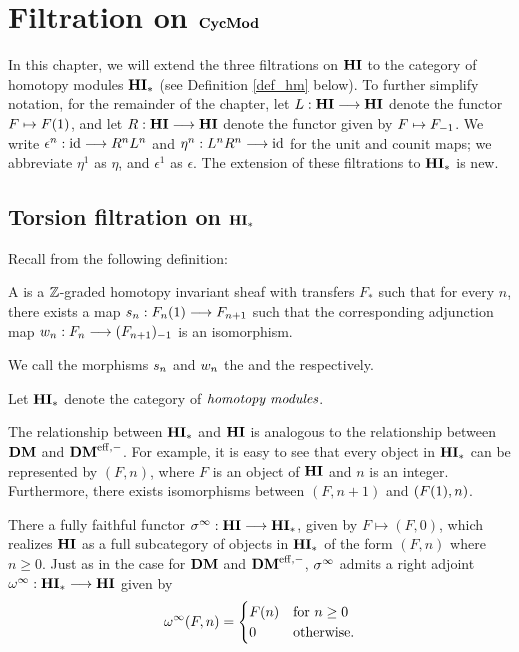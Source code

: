\newpage
\chapter{Filtration on $\CycMod$}\label{sect_filtration_cycmod}

In this chapter, we will extend the three filtrations on
$\HI$ to the category of homotopy modules $\HM$ (see Definition
\ref{def_hm} below). To further simplify notation, for the
remainder of the chapter, let $L: \HI \to \HI$ denote the functor 
$F \mapsto \LHI{F}$, and let $R: \HI \to \HI$ denote the functor 
given by $F \mapsto \RHI{F}$. We write $\epsilon^n : \id \to 
R^nL^n$ and $\eta^n: L^nR^n \to \id$ for the unit and counit maps; 
we abbreviate $\eta^1$ as $\eta$, and $\epsilon^1$ as $\epsilon$.
The extension of these filtrations to $\HM$ is new.

\section{Torsion filtration on $\HM$}


Recall from \cite[1.17]{DegModHom} the following definition:

\begin{defn}\label{def_hm}
A  is a $\Z$-graded homotopy 
invariant sheaf with transfers $F_*$ such that for every $n$, 
there exists a map $\susp_n: \LHI{F_n} \to F_{n+1}$ such that the 
corresponding adjunction map $\deloop_n: F_n \to \RHI{(F_{n+1})}$
is an isomorphism.

We call the morphisms $\susp_n$ and $\deloop_n$ the  and the  respectively.

Let $\HM$ denote the category of $\DEF{homotopy modules}$.
\end{defn}

The relationship between $\HM$ and $\HI$ is analogous to the 
relationship between $\DM$ and $\DMeff$. For example, it is easy 
to see that every object in $\HM$ can be represented by $(F, n)$, 
where $F$ is an object of $\HI$ and $n$ is an integer. 
Furthermore, there exists isomorphisms between $(F, n + 1)$ and
$(\LHI{F}, n)$. 

There a fully faithful functor $\spectHI : \HI \to \HM$, given by 
$F \mapsto (F, 0)$, which realizes $\HI$ as a full subcategory of 
objects in $\HM$ of the form $(F, n)$ where $n \geq 0$. Just as in
the case for $\DM$ and $\DMeff$, $\spectHI$ admits a right adjoint
$\loopHM : \HM \to \HI$ given by 
\[
\loopHM(F, n) = \begin{cases}
\LHI[n]F &\textrm{for }n \geq 0\\
0 &\textrm{otherwise}.
\end{cases}
\]

